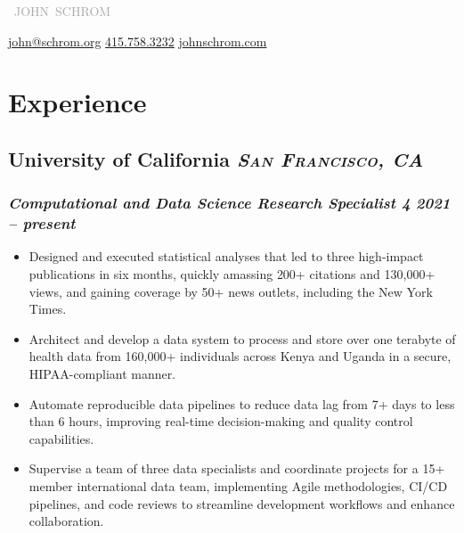 \documentclass[11pt]{article}
\newcommand{\rside}[1]{
  \hfill {\itshape #1}%
}
\begin{document}

\begin{center}
  {
    \mbox{
    \fontsize{30}{12} 
    \selectfont
    \textcolor{darkgray}{JOHN SCHROM}
    }
  } \\ \medskip

  \href{mailto:john@schrom.org}{john@schrom.org} \quad \textbullet \quad
  \href{tel:4157583232}{415.758.3232} \quad \textbullet \quad
  \href{https://johnschrom.com}{johnschrom.com}

\end{center}


\section{Experience}
\subsection{University of California \rside{\normalfont\large\bfseries\scshape{San Francisco, CA}}}
\subsubsection{\textit{Computational and Data Science Research Specialist 4} \rside{2021 -- present}}
\begin{itemize}[label=-]
  \item Designed and executed statistical analyses that led to three high-impact publications in six months, quickly amassing \textcolor{Bittersweet}{200+ citations} and \textcolor{Bittersweet}{130,000+ views}, and gaining coverage by \textcolor{Bittersweet}{50+ news outlets}, including the New York Times.
  \item Architect and develop a data system to process and store over \textcolor{Bittersweet}{one terabyte of health data} from \textcolor{Bittersweet}{160,000+ individuals} across Kenya and Uganda in a secure, HIPAA-compliant manner.
  \item Automate reproducible data pipelines to reduce data lag \textcolor{Bittersweet}{from 7+ days} to \textcolor{Bittersweet}{less than 6 hours}, improving real-time decision-making and quality control capabilities.
  \item Supervise a \textcolor{Bittersweet}{team of three data specialists} and coordinate projects for a \textcolor{Bittersweet}{15+ member international data team}, implementing Agile methodologies, CI/CD pipelines, and code reviews to streamline development workflows and enhance collaboration.
\end{itemize}
\end{document}
